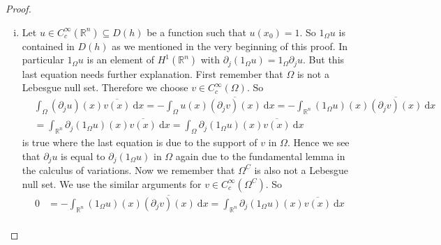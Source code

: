 \documentclass[12pt,longbibliography]{article}
\def\R{\mathbb{R}}
\theoremstyle{definition}
\theoremstyle{remark}
\theoremstyle{example}
\begin{document}
\begin{proof}
\begin{enumerate}[i.)]
Let $\R^{n} = \Omega_{1}$ be true. We choose a compact set $K \subseteq \Omega$ such that $\lambda(K) > 0$. This is possible
since $\Omega$ is not a pure point set in $\R^{n}$. For every $x \in K$ there exists a $r = r(x) > 0$ such that 
$$
\lambda (B(x,r) \cap \Omega)=0
$$ 
since $K \subseteq \Omega \subseteq \R^{n}=\Omega_{1}$. By the compactness of $K$ we conclude that 
$$
K \subseteq B(x_{1},r_{1}) \cup \dots \cup B(x_{m},r_{m}) 
$$
holds for some $x_{1}, \dots, x_{m} \in K$ where $r_{j}$ are given by $\Omega_{1}$. But then
$$
0 < \lambda(K) = \lambda(K \cap \Omega) \leq \sum_{j=1}^{m} \lambda \bigl( B(x_{j},r_{j}) \cap \Omega \bigr) = 0
$$
is obviously a contradiction. Using the same argumentation for $\R^{n} = \Omega_{2}$ leads to a contradiction as well. 
Hence there must exist a $x_{0} \in \R^{n}$ such that neither $\Omega \cap B(x_{0},r)$ nor $\Omega^{C} \cap B(x_{0},r)$ 
is a Lebesgue null set for any radius $r>0$.
\item Let $u \in C_{c}^{\infty}(\R^{n}) \subseteq D(h)$ be a function such that $u(x_{0}) = 1$. 
So $1_{\Omega} u$ is contained in $D(h)$ as we mentioned in the very beginning of this proof. 
In particular $1_{\Omega} u$ is an element of $H^{1}(\R^{n})$ with 
$\partial_{j} (1_{\Omega} u) = 1_{\Omega} \partial_{j}u$. But this last equation needs further explanation. First remember
that $\Omega$ is not a Lebesgue null set. Therefore we choose $v \in C_{c}^{\infty}(\Omega)$. So
\begin{align*}
& \int_{\Omega} (\partial_{j} u)(x) \overline{v(x)} \ \mathrm{d}x = - \int_{\Omega} u(x) \overline{(\partial_{j} v)(x)} \ \mathrm{d}x
 =  - \int_{\R^{n}} (1_{\Omega} u)(x) \overline{(\partial_{j} v)(x)} \ \mathrm{d}x \\
& = \int_{\R^{n}} \partial_{j}(1_{\Omega} u)(x) \overline{v(x)} \ \mathrm{d}x
 = \int_{\Omega} \partial_{j}(1_{\Omega} u)(x) \overline{v(x)} \ \mathrm{d}x
\end{align*}
is true where the last equation is due to the support of $v$ in $\Omega$. Hence we see that $\partial_{j} u$ is equal to 
$\partial_{j}(1_{\Omega} u)$ in $\Omega$ again due to the fundamental lemma in the calculus of variations. Now we remember 
that $\Omega^{C}$ is also not a Lebesgue null set. We
use the similar arguments for $v \in C_{c}^{\infty}(\Omega^{C})$. So
\begin{align*}
0 & = - \int_{\R^{n}} (1_{\Omega} u)(x) \overline{(\partial_{j} v)(x)} \ \mathrm{d}x = 
\int_{\R^{n}} \partial_{j}(1_{\Omega} u)(x) \overline{v(x)} \ \mathrm{d}x \\

\end{align*}
\end{enumerate}
\end{proof}
\end{document}
